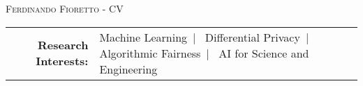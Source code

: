 \documentclass[localFont,alternative]{documentMETADATA}
\begin{document}
\makecvheader\sloppy\allowdisplaybreaks

	\makecvfooter
		{\textsc{}} %
		{\textsc{Ferdinando Fioretto - CV}}
		{\thepage}


	\begin{tabular}{r l} 
	{\bf Research Interests:} &
	{Machine Learning}~|~
	{Differential Privacy}~|~
	{Algorithmic Fairness}~|~
	{AI for Science and Engineering}
	\end{tabular}


\setlength{\LTleft}{-0pt}
		 
\setlength{\LTleft}{-20pt}
	
\setlength{\LTleft}{-0pt}
	
	
	 
	 
	
	
	
\end{document}
